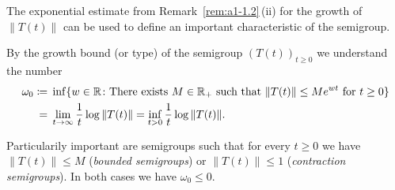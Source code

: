 The exponential estimate from Remark~\ref{rem:a1-1.2}\,(ii) for the growth of $\|T(t)\|$ can be used to define an important characteristic of the semigroup.
\begin{definition}\label{def:a1-1.3}
By the growth bound (or type) of the semigroup $(T(t))_{t\geq0}$ we understand the number
\begin{align*}\label{eq:a1-1.1}
\omega_{0} \coloneqq{}& \inf\{w \in \mathbb{R} \colon \text{There exists } M \in \mathbb{R}_{+} \text{ such that } \|T(t)\| \leq Me^{wt} \text{ for } t \geq 0\} \\
={}& \lim_{t\to\infty} \frac{1}{t}\log\|T(t)\| = \inf_{t>0} \frac{1}{t}\log\|T(t)\| \notag .
\end{align*}
\end{definition}
\noindent Particularily important are semigroups such that for every $t \geq 0$ we have $\|T(t)\| \leq M$ (\emph{bounded semigroups}) or $\|T(t)\| \leq 1$ (\emph{contraction semigroups}).
In both cases we have $\omega_{0} \leq 0$.

